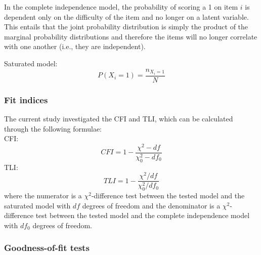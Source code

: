 \documentclass[Royal,sageapa,times,doublespace]{sagej}
\begin{document}
In the complete independence model, the probability of scoring a 1 on item $i$ is dependent only on the difficulty of the item and no longer on
a latent variable. This entails that the joint probability distribution is simply the product of the marginal probability distributions and therefore the
items will no longer correlate with one another (i.e., they are independent).

Saturated model:
\begin{equation}
P(X_i = 1) = \frac{n_{X_i = 1}}{N}
\end{equation}
\subsubsection{Fit indices} 
The current study investigated the CFI and TLI, which can be calculated through the following formulae: \\

CFI:
\begin{equation}
CFI = 1 - \frac{\chi^{2} - df}{\chi^{2}_{0} - df_0}
\end{equation}
TLI:
\begin{equation}
TLI = 1 - \frac{\chi^{2}/df}{\chi^{2}_{0}/df_0}
\end{equation}
where the numerator is a $\chi^2$-difference test between the tested model and the saturated model with $df$ degrees of freedom 
and the denominator is a $\chi^2$-difference test between the tested model and the complete independence model with $df_0$ degrees of freedom.

\subsubsection{Goodness-of-fit tests}
\end{document}
